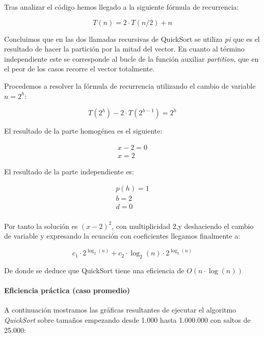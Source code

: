 \documentclass[a4paper,12pt]{article} %
\begin{document}
Tras analizar el código hemos llegado a la siguiente fórmula de recurrencia:

\begin{equation*}
	T(n) = 2\cdot T(n/2) + n
\end{equation*}

Concluimos que en las dos llamadas recursivas de QuickSort
se utiliza \textit{pi} que es el resultado de hacer la partición por la mitad del vector. En cuanto
al término independiente este se corresponde al bucle de la función auxiliar \textit{partition}, que en
el peor de los casos recorre el vector totalmente.

Procedemos a resolver la fórmula de recurrencia utilizando el cambio de variable $n=2^h$:

\begin{equation*}
	T(2^{h}) - 2\cdot T(2^{h-1}) = 2^{h}
\end{equation*}

El resultado de la parte homogénea es el siguiente:

\begin{align*}
	x - 2 = 0 \\
	x = 2
\end{align*}

El resultado de la parte independiente es:

\begin{align*}
	p(h) = 1 \\
	b = 2    \\
	d = 0    \\
\end{align*}

Por tanto la solución es $(x-2)^2$, con multiplicidad 2,y deshaciendo el
cambio de variable y expresando la ecuación con coeficientes llegamos finalmente
a:

\begin{equation*}
	c_{1}\cdot 2^{\log _{2}(n)} + c_{2}\cdot \log_{2}(n)\cdot 2^{\log_{2}(n)}
\end{equation*}

De donde se deduce que QuickSort tiene una eficiencia de $O(n\cdot \log(n))$
\\
\paragraph{Eficiencia práctica (caso promedio)}

A continuación mostramos las gráficas resultantes de ejecutar el algoritmo \textit{QuickSort}
sobre tamaños empezando desde 1.000 hasta 1.000.000 con saltos de 25.000:
\end{document}
